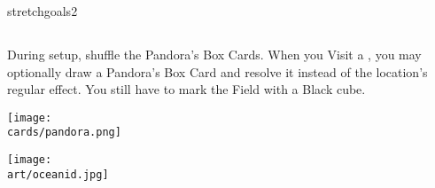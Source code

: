 \begin{multicols*}{2}
\begin{expansion}{stretchgoals2}
  \subsection*{}
  During setup, shuffle the Pandora's Box Cards.
  When you Visit a , you may optionally draw a Pandora's Box Card and resolve it instead of the location's regular effect.
  You still have to mark the Field with a Black cube.

  \medskip
  \begin{center}
    \texttt{[image: \\cards/pandora.png]}
  \end{center}
\end{expansion}

\vspace*{\fill}

\columnbreak

\texttt{[image: \\art/oceanid.jpg]}

\end{multicols*}
